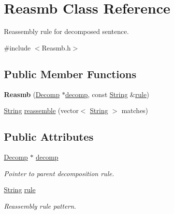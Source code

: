 \hypertarget{classReasmb}{}\section{Reasmb Class Reference}
\label{classReasmb}


Reassembly rule for decomposed sentence.  




{\ttfamily \#include $<$Reasmb.\+h$>$}

\subsection*{Public Member Functions}
\begin{DoxyCompactItemize}
\item 
\mbox{\label{classReasmb_a3b2f5458d8810917c76cfaac15b749d4}} 
{\bfseries Reasmb} (\mbox{\hyperlink{classDecomp}{Decomp}} $\ast$\mbox{\hyperlink{classReasmb_a70b89635a2cc4f04cd30ec0bcb0bd0bf}{decomp}}, const \mbox{\hyperlink{classString}{String}} \&\mbox{\hyperlink{classReasmb_a5f6b1b32f233f3dc7222f324791337c2}{rule}})
\item 
\mbox{\hyperlink{classString}{String}} \mbox{\hyperlink{classReasmb_abba1a0d8940231ac3e9ce7fd39173eb4}{reassemble}} (vector$<$ \mbox{\hyperlink{classString}{String}} $>$ matches)
\end{DoxyCompactItemize}
\subsection*{Public Attributes}
\begin{DoxyCompactItemize}
\item 
\mbox{\label{classReasmb_a70b89635a2cc4f04cd30ec0bcb0bd0bf}} 
\mbox{\hyperlink{classDecomp}{Decomp}} $\ast$ \mbox{\hyperlink{classReasmb_a70b89635a2cc4f04cd30ec0bcb0bd0bf}{decomp}}
\begin{DoxyCompactList}\small\item\em Pointer to parent decomposition rule. \end{DoxyCompactList}\item 
\mbox{\label{classReasmb_a5f6b1b32f233f3dc7222f324791337c2}} 
\mbox{\hyperlink{classString}{String}} \mbox{\hyperlink{classReasmb_a5f6b1b32f233f3dc7222f324791337c2}{rule}}
\begin{DoxyCompactList}\small\item\em Reassembly rule pattern. \end{DoxyCompactList}\end{DoxyCompactItemize}
